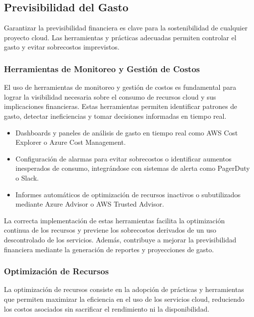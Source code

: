 {        \subsection{Previsibilidad del Gasto}
            Garantizar la previsibilidad financiera es clave para la sostenibilidad de cualquier proyecto cloud. Las herramientas y prácticas adecuadas permiten controlar el gasto y evitar sobrecostos imprevistos.
                
            \subsubsection{Herramientas de Monitoreo y Gestión de Costos}
                El uso de herramientas de monitoreo y gestión de costos es fundamental para lograr la visibilidad necesaria sobre el consumo de recursos cloud y sus implicaciones financieras. Estas herramientas permiten identificar patrones de gasto, detectar ineficiencias y tomar decisiones informadas en tiempo real.
                
                \begin{itemize}
                    \item Dashboards y paneles de análisis de gasto en tiempo real como AWS Cost Explorer o Azure Cost Management.
                    \item Configuración de alarmas para evitar sobrecostos o identificar aumentos inesperados de consumo, integrándose con sistemas de alerta como PagerDuty o Slack.
                    \item Informes automáticos de optimización de recursos inactivos o subutilizados mediante Azure Advisor o AWS Trusted Advisor.
                \end{itemize}

                La correcta implementación de estas herramientas facilita la optimización continua de los recursos y previene los sobrecostos derivados de un uso descontrolado de los servicios. Además, contribuye a mejorar la previsibilidad financiera mediante la generación de reportes y proyecciones de gasto.
                
            \subsubsection{Optimización de Recursos}
                La optimización de recursos consiste en la adopción de prácticas y herramientas que permiten maximizar la eficiencia en el uso de los servicios cloud, reduciendo los costos asociados sin sacrificar el rendimiento ni la disponibilidad.
                
}
